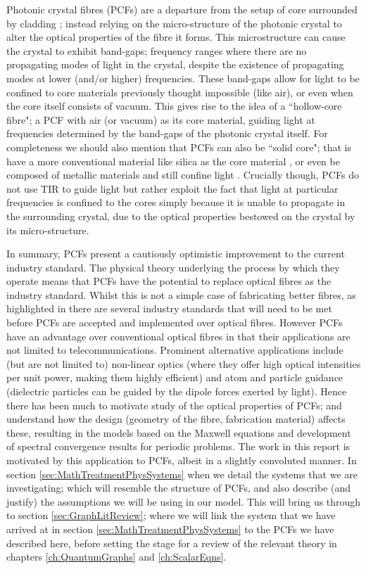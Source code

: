 Photonic crystal fibres (PCFs) are a departure from the setup of core surrounded by cladding \cite{russell2003photonic}; instead relying on the micro-structure of the photonic crystal to alter the optical properties of the fibre it forms.
This microstructure can cause the crystal to exhibit band-gaps; frequency ranges where there are no propagating modes of light in the crystal, despite the existence of propagating modes at lower (and/or higher) frequencies.
These band-gaps allow for light to be confined to core materials previously thought impossible (like air), or even when the core itself consists of vacuum.
This gives rise to the idea of a ``hollow-core fibre"; a PCF with air (or vacuum) as its core material, guiding light at frequencies determined by the band-gaps of the photonic crystal itself.
For completeness we should also mention that PCFs can also be ``solid core"; that is have a more conventional material like silica as the core material \cite{hou2008metallic}, or even be composed of metallic materials and still confine light \cite{luan2004allsolid}.
Crucially though, PCFs do not use TIR to guide light but rather exploit the fact that light at particular frequencies is confined to the cores simply because it is unable to propagate in the surrounding crystal, due to the optical properties bestowed on the crystal by its micro-structure.

In summary, PCFs present a cautiously optimistic improvement to the current industry standard.
The physical theory underlying the process by which they operate means that PCFs have the potential to replace optical fibres as the industry standard.
Whilst this is not a simple case of fabricating better fibres, as highlighted in \cite{knight2003photonic} there are several industry standards that will need to be met before PCFs are accepted and implemented over optical fibres.
However PCFs have an advantage over conventional optical fibres in that their applications are not limited to telecommunications.
Prominent alternative applications include (but are not limited to) non-linear optics (where they offer high optical intensities per unit power, making them highly efficient) and atom and particle guidance (dielectric particles can be guided by the dipole forces exerted by light).
Hence there has been much to motivate study of the optical properties of PCFs; and understand how the design (geometry of the fibre, fabrication material) affects these, resulting in the models based on the Maxwell equations and development of spectral convergence results for periodic problems.
The work in this report is motivated by this application to PCFs, albeit in a slightly convoluted manner.
In section \ref{sec:MathTreatmentPhysSystems} when we detail the systems that we are investigating; which will resemble the structure of PCFs, and also describe (and justify) the assumptions we will be using in our model.
This will bring us through to section \ref{sec:GraphLitReview}; where we will link the system that we have arrived at in section \ref{sec:MathTreatmentPhysSystems} to the PCFs we have described here, before setting the stage for a review of the relevant theory in chapters \ref{ch:QuantumGraphs} and \ref{ch:ScalarEqns}.

